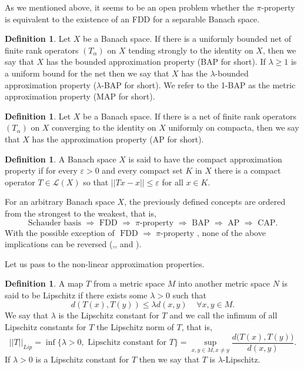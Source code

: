 \documentclass[11pt]{amsart}
\newcommand{\ep}{\varepsilon}
\newcommand{\<}{\langle}
\renewcommand{\>}{\rangle}
\theoremstyle{definition}
\newtheorem{definition}[theorem]{Definition}
\theoremstyle{remark}
\numberwithin{equation}{section}
\begin{document}
As we mentioned above, it seems to be an open problem whether the $\pi$-property is equivalent to the existence of an FDD for a separable Banach space.
\begin{definition}
Let $X$ be a Banach space. If there is a uniformly bounded net of finite rank operators $(T_\alpha)$ on $X$ tending strongly to the identity on $X$, then we say that $X$ has the bounded approximation property (BAP for short). If $\lambda\ge1$ is a uniform bound for the net then we say that $X$ has the $\lambda$-bounded approximation property ($\lambda$-BAP for short). We refer to  the 1-BAP as the metric approximation property (MAP for short).\\
\end{definition}



\begin{definition}
Let $X$ be a Banach space. If there is a net of finite rank operators $(T_\alpha)$ on $X$ converging to the identity on $X$ uniformly on compacta, then we say that $X$ has the approximation property (AP for short).\\
\end{definition}

\begin{definition}
A Banach space $X$ is said to have the compact approximation property if for every $\ep>0$ and every compact set $K$ in $X$ there is a compact operator $T\in \mathcal{L}(X)$ so that $||Tx-x||\le \ep$ for all $x\in K$.
\end{definition}


For an arbitrary Banach space $X$, the previously defined concepts are ordered from the strongest to the weakest, that is,
$$\text{Schauder basis }\Rightarrow\text{ FDD }\Rightarrow\;\pi\text{-property }\Rightarrow\text{ BAP }\Rightarrow\text{ AP }\Rightarrow\text{ CAP.}$$
With the possible exception of $\text{ FDD }\Rightarrow\;\pi\text{-property }$, none of the above implications can be reversed (\cite{Sza87},\cite {Rea}, \cite{FJ73} and \cite{Wil92}).


Let us pass to  the non-linear approximation properties.

\begin{definition}
A map $T$ from a metric space $M$ into another metric space $N$ is said to be Lipschitz if there exists some $\lambda>0$ such that
$$d(T(x),T(y))\le \lambda d(x,y) \;\;\;\;\forall x,y\in M.$$
We say that $\lambda$ is the Lipschitz constant for $T$ and we call the infimum of all Lipschitz constants for $T$ the Lipschitz norm of $T$, that is,
$$||T||_{Lip}=\inf\big\{\lambda>0,\text{ Lipschitz constant for }T\big\}=\sup\limits_{x,y\in M, x\ne y}\frac{d\big(T(x),T(y)\big)}{d(x,y)}.$$
If $\lambda>0$ is a Lipschitz constant for $T$ then we say that $T$ is $\lambda$-Lipschitz.
\end{definition}
\end{document}
